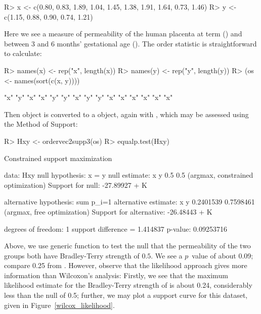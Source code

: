\documentclass[article]{jss}
\begin{document}
\begin{Schunk}
\begin{Sinput}
R> x <- c(0.80, 0.83, 1.89, 1.04, 1.45, 1.38, 1.91, 1.64, 0.73, 1.46)
R> y <- c(1.15, 0.88, 0.90, 0.74, 1.21)
\end{Sinput}
\end{Schunk}

Here we see a measure of permeability of the human placenta at term
() and between 3 and 6 months' gestational age ().
The order statistic is straightforward to calculate:

\begin{Schunk}
\begin{Sinput}
R> names(x) <- rep("x", length(x))
R> names(y) <- rep("y", length(y))
R> (os <- names(sort(c(x, y))))
\end{Sinput}
\begin{Soutput}
 [1] "x" "y" "x" "x" "y" "y" "x" "y" "y" "x" "x" "x" "x" "x" "x"
\end{Soutput}
\end{Schunk}

Then object  is converted to a  object, again
with , which may be assessed using the Method
of Support:

\begin{Schunk}
\begin{Sinput}
R> Hxy <- ordervec2supp3(os)
R> equalp.test(Hxy)
\end{Sinput}
\begin{Soutput}
	Constrained support maximization

data:  Hxy
null hypothesis: x = y
null estimate:
  x   y 
0.5 0.5 
(argmax, constrained optimization)
Support for null:  -27.89927 + K

alternative hypothesis:  sum p_i=1 
alternative estimate:
        x         y 
0.2401539 0.7598461 
(argmax, free optimization)
Support for alternative:  -26.48443 + K

degrees of freedom: 1
support difference = 1.414837
p-value: 0.09253716 
\end{Soutput}
\end{Schunk}

Above, we use generic function  to test the null
that the permeability of the two groups both have Bradley-Terry
strength of $0.5$.  We see a $p$~value of about 0.09; compare 0.25 from
.  However, observe that the 
likelihood approach gives more information than Wilcoxon's analysis:
Firstly, we see that the maximum likelihood estimate for the
Bradley-Terry strength of  is about 0.24, considerably less
than the null of 0.5; further, we may plot a support curve for this
dataset, given in Figure~\ref{wilcox_likelihood}.
\end{document}
